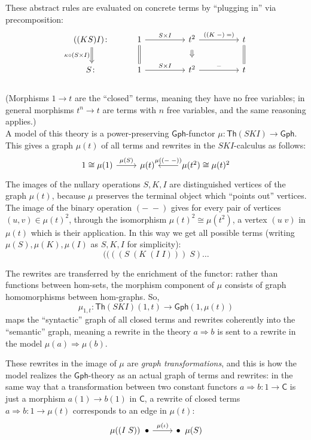 \documentclass{amsart}
\theoremstyle{definition}
\newcommand{\Th}{\mathsf{Th}}
\newcommand{\Gph}{\mathsf{Gph}}
\newcommand{\C}{\mathsf{C}}
\newcommand{\maps}{\colon}
\begin{document}
These abstract rules are evaluated on concrete terms by ``plugging in'' via precomposition:
\[\begin{tikzcd}
	((KS)I)\maps \arrow[Rightarrow,d,swap,"\kappa \circ (S\times I)"] & 1 \arrow[d,equal] \arrow[rr,"S\times I"] && t^2 \arrow[Rightarrow,d,shorten >=0.2cm,shorten <=0.2cm] \arrow[rr,"((K\; -)\; =)"] && t \arrow[d,equal]\\
	S\maps & 1 \arrow[rr,"S\times I"] && t^2 \arrow[rr,"-"] && t
\end{tikzcd}\]\\
(Morphisms $1\to t$ are the ``closed'' terms, meaning they have no free variables; in general morphisms $t^n\to t$ are terms with $n$ free variables, and the same reasoning applies.)\\

A model of this theory is a power-preserving $\Gph$-functor $\mu\maps \Th(SKI) \to \Gph$. This gives a graph $\mu(t)$ of all terms and rewrites in the $SKI$-calculus as follows:
\[\begin{tikzcd}
1 \cong \mu(1) \arrow[r,"\mu(S)"] & \mu(t) & \mu(t^2) \arrow[l,swap,"\mu(\left(-\;-\right))"] \cong \mu(t)^2
\end{tikzcd}\]
The images of the nullary operations $S,K,I$ are distinguished vertices of the graph $\mu(t)$, because $\mu$ preserves the terminal object which ``points out'' vertices. The image of the binary operation $(-\; -)$ gives for every pair of vertices $(u,v) \in \mu(t)^2$, through the isomorphism $\mu(t)^2 \cong \mu(t^2)$, a vertex $(u\; v)$ in $\mu(t)$ which is their application. In this way we get all possible terms (writing $\mu(S),\mu(K),\mu(I)$ as $S,K,I$ for simplicity): 
\[  ((((S\; (K\; (I\; I)))\; S) \dots \]

The rewrites are transferred by the enrichment of the functor: rather than functions between hom-sets, the morphism component of $\mu$ consists of graph homomorphisms between hom-graphs. So, $$\mu_{1,t}\maps \Th(SKI)(1,t)\to \Gph(1,\mu(t))$$ maps the ``syntactic'' graph of all closed terms and rewrites coherently into the ``semantic'' graph, meaning a rewrite in the theory $a\Rightarrow b$ is sent to a rewrite in the model $\mu(a) \Rightarrow \mu(b)$.

These rewrites in the image of $\mu$ are \textit{graph transformations}, and this is how the model realizes the $\Gph$-theory as an actual graph of terms and rewrites: in the same way that a transformation between two constant functors $a\Rightarrow b\maps 1\to \C$ is just a morphism $a(1)\to b(1)$ in $\C$, a rewrite of closed terms $a\Rightarrow b\maps 1\to \mu(t)$ corresponds to an edge in $\mu(t)$:
\[\begin{tikzcd}
	\mu((I\; S)) \;\; \bullet \arrow[r,"\mu(\iota)"] & \bullet \;\; \mu(S)
\end{tikzcd}\]
\end{document}
